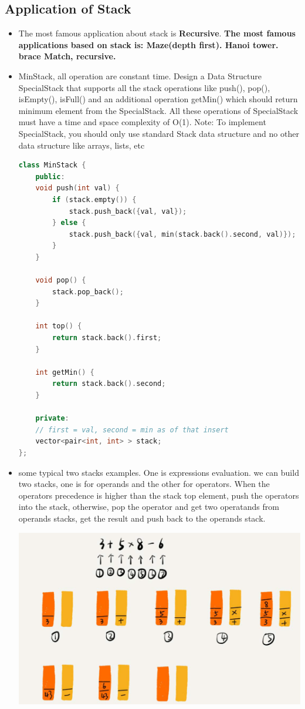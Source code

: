 \documentclass[a4paper,11pt,twoside]{book}
\begin{document}
\subsection{Application of Stack}
\begin{itemize}
		
\item The most famous application about stack is \textbf{Recursive}. \textbf{The most famous applications based on stack is:  Maze(depth first). Hanoi tower. brace Match, recursive.}  


\item MinStack, all operation are constant time. Design a Data Structure SpecialStack that supports all the stack operations like push(), pop(), isEmpty(), isFull() and an additional operation getMin() which should return minimum element from the SpecialStack. All these operations of SpecialStack must have a time and space complexity of O(1). 
Note: To implement SpecialStack, you should only use standard Stack data structure and no other data structure like arrays, lists, etc 
\begin{lstlisting}[frame=single, language=c++, basicstyle=\scriptsize]
class MinStack {
	public:
	void push(int val) {
		if (stack.empty()) {
			stack.push_back({val, val});
		} else {
			stack.push_back({val, min(stack.back().second, val)});
		}
	}
	
	void pop() {
		stack.pop_back();
	}
	
	int top() {
		return stack.back().first;
	}
	
	int getMin() {
		return stack.back().second;
	}
	
	private:
	// first = val, second = min as of that insert
	vector<pair<int, int> > stack;
};
\end{lstlisting}

	\item some typical two stacks examples. One is expressions evaluation. we can build two stacks, one is for operands and the other for operators. When the operators precedence is higher than the stack top element, push the operators into the stack, otherwise, pop the operator and get two operatands from operands stacks, get the result and push back to the operands stack.  
	\begin{center}
			\includegraphics[scale=0.45]{pics/stacks_two.png} 
	\end{center}


\end{itemize}
\end{document}
